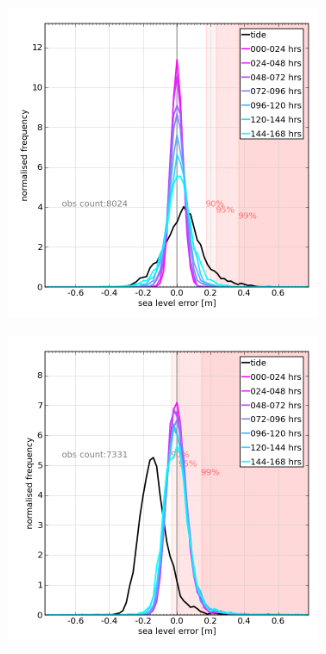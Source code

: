 \begin{figure}[H]
    \centering
    \begin{subfigure}{0.30\textwidth}
    \includegraphics[width=0.9\textwidth]{figures/plots/0013_verify_pdf.png}
    \caption{}
    \end{subfigure}
    \begin{subfigure}{0.30\textwidth}
    \includegraphics[width=0.9\textwidth]{figures/plots/0043_verify_pdf.png}

\end{subfigure}
\end{figure}
